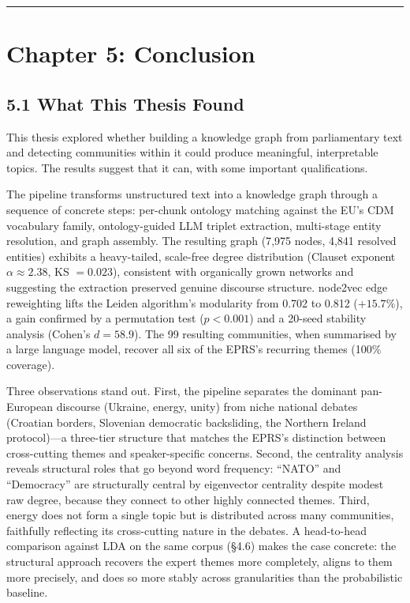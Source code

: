 \documentclass[11pt]{article}
\begin{document}
\hrule

\section{Chapter 5: Conclusion}

\subsection{5.1 What This Thesis Found}

This thesis explored whether building a knowledge graph from parliamentary text and detecting communities within it could produce meaningful, interpretable topics. The results suggest that it can, with some important qualifications.

The pipeline transforms unstructured text into a knowledge graph through a sequence of concrete steps: per-chunk ontology matching against the EU's CDM vocabulary family, ontology-guided LLM triplet extraction, multi-stage entity resolution, and graph assembly. The resulting graph (7{,}975 nodes, 4{,}841 resolved entities) exhibits a heavy-tailed, scale-free degree distribution (Clauset exponent $\alpha \approx 2.38$, KS $=0.023$), consistent with organically grown networks and suggesting the extraction preserved genuine discourse structure. node2vec edge reweighting lifts the Leiden algorithm's modularity from 0.702 to 0.812 ($+15.7\%$), a gain confirmed by a permutation test ($p<0.001$) and a 20-seed stability analysis (Cohen's $d = 58.9$). The 99 resulting communities, when summarised by a large language model, recover all six of the EPRS's recurring themes (100\% coverage).

Three observations stand out. First, the pipeline separates the dominant pan-European discourse (Ukraine, energy, unity) from niche national debates (Croatian borders, Slovenian democratic backsliding, the Northern Ireland protocol)---a three-tier structure that matches the EPRS's distinction between cross-cutting themes and speaker-specific concerns. Second, the centrality analysis reveals structural roles that go beyond word frequency: ``NATO'' and ``Democracy'' are structurally central by eigenvector centrality despite modest raw degree, because they connect to other highly connected themes. Third, energy does not form a single topic but is distributed across many communities, faithfully reflecting its cross-cutting nature in the debates. A head-to-head comparison against LDA on the same corpus (\S4.6) makes the case concrete: the structural approach recovers the expert themes more completely, aligns to them more precisely, and does so more stably across granularities than the probabilistic baseline.
\end{document}
